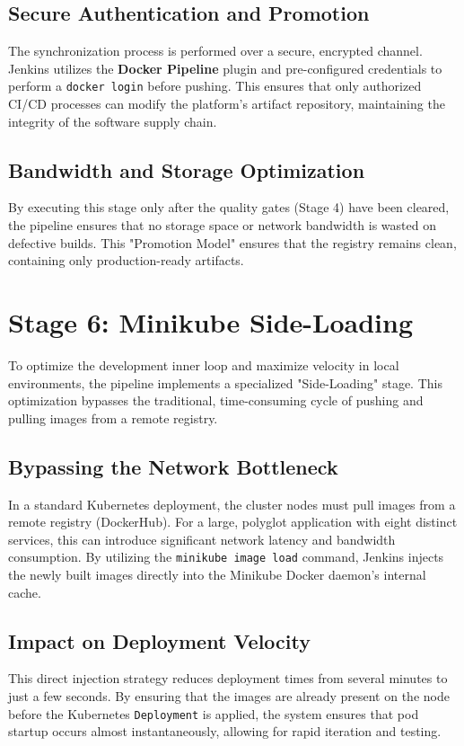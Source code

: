 \documentclass[12pt,a4paper]{report}
\begin{document}
\subsection{Secure Authentication and Promotion}
The synchronization process is performed over a secure, encrypted channel. Jenkins utilizes the \textbf{Docker Pipeline} plugin and pre-configured credentials to perform a \texttt{docker login} before pushing. This ensures that only authorized CI/CD processes can modify the platform's artifact repository, maintaining the integrity of the software supply chain.

\subsection{Bandwidth and Storage Optimization}
By executing this stage only after the quality gates (Stage 4) have been cleared, the pipeline ensures that no storage space or network bandwidth is wasted on defective builds. This "Promotion Model" ensures that the registry remains clean, containing only production-ready artifacts.

\section{Stage 6: Minikube Side-Loading}
To optimize the development inner loop and maximize velocity in local environments, the pipeline implements a specialized "Side-Loading" stage. This optimization bypasses the traditional, time-consuming cycle of pushing and pulling images from a remote registry.

\subsection{Bypassing the Network Bottleneck}
In a standard Kubernetes deployment, the cluster nodes must pull images from a remote registry (DockerHub). For a large, polyglot application with eight distinct services, this can introduce significant network latency and bandwidth consumption. By utilizing the \texttt{minikube image load} command, Jenkins injects the newly built images directly into the Minikube Docker daemon's internal cache.

\subsection{Impact on Deployment Velocity}
This direct injection strategy reduces deployment times from several minutes to just a few seconds. By ensuring that the images are already present on the node before the Kubernetes \texttt{Deployment} is applied, the system ensures that pod startup occurs almost instantaneously, allowing for rapid iteration and testing.
\end{document}

